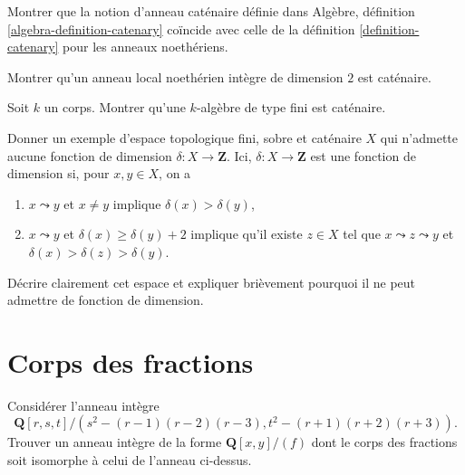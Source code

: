 \begin{exercise}
\label{exercise-catenary-the-same}
Montrer que la notion d'anneau caténaire définie dans
Algèbre, définition \ref{algebra-definition-catenary}
coïncide avec celle de la définition \ref{definition-catenary}
pour les anneaux noethériens.
\end{exercise}

\begin{exercise}
\label{exercise-Noetherian-local-domain-dim-2-catenary}
Montrer qu'un anneau local noethérien intègre de dimension $2$ est caténaire.
\end{exercise}

\begin{exercise}
\label{exercise-finite-type-over-field-catenary}
Soit $k$ un corps.
Montrer qu'une $k$-algèbre de type fini est caténaire.
\end{exercise}

\begin{exercise}
\label{exercise-example-no-dim-function}
Donner un exemple d'espace topologique fini, sobre et caténaire
$X$ qui n'admette aucune fonction de dimension $\delta : X \to \mathbf{Z}$.
Ici, $\delta : X \to \mathbf{Z}$ est une fonction de dimension si,
pour $x, y \in X$, on a
\begin{enumerate}
\item $x \leadsto y$ et $x \not = y$ implique $\delta(x) > \delta(y)$,
\item $x \leadsto y$ et $\delta(x) \geq \delta(y) + 2$ implique
qu'il existe $z \in X$ tel que $x \leadsto z \leadsto y$ et
$\delta(x) > \delta(z) > \delta(y)$.
\end{enumerate}
Décrire clairement cet espace et expliquer brièvement pourquoi il
ne peut admettre de fonction de dimension.
\end{exercise}




\section{Corps des fractions}
\label{section-fraction-fields}

\begin{exercise}
\label{exercise-find-fraction-field}
Considérer l'anneau intègre
$$
{\mathbf Q}[r, s, t]/(s^2-(r-1)(r-2)(r-3), t^2-(r + 1)(r + 2)(r + 3)).
$$
Trouver un anneau intègre de la forme ${\mathbf Q}[x, y]/(f)$ dont le
corps des fractions soit isomorphe à celui de l'anneau ci-dessus.
\end{exercise}



